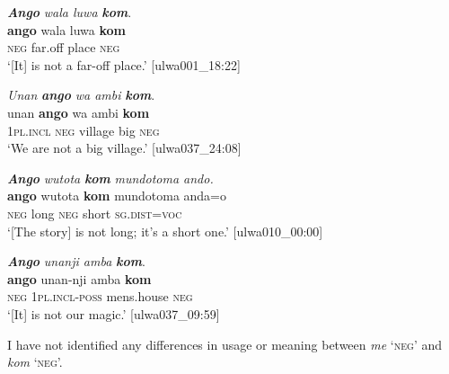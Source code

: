 

\ea%
    \label{ex:syntax:151}
          \textbf{\textit{Ango}} \textit{wala luwa} \textbf{\textit{kom}}.\\
\gll \textbf{ango}  wala  luwa  \textbf{kom}\\
    \textsc{neg}  far.off  place  \textsc{neg}\\
\glt `[It] is not a far-off place.’ [ulwa001\_18:22]
\z

\ea%
    \label{ex:syntax:152}
          \textit{Unan} \textbf{\textit{ango}} \textit{wa ambi} \textbf{\textit{kom}}.\\
\gll unan    \textbf{ango}  wa    ambi  \textbf{kom}\\
    1\textsc{pl.incl}  \textsc{neg}  village  big    \textsc{neg}\\
\glt `We are not a big village.’ [ulwa037\_24:08]
\z

\ea%
    \label{ex:syntax:153}
          \textbf{\textit{Ango}} \textit{wutota} \textbf{\textit{kom}} \textit{mundotoma ando.}\\
\gll    \textbf{ango}  wutota  \textbf{kom}  mundotoma  anda{}=o\\
    \textsc{neg}  long  \textsc{neg}  short      \textsc{sg.dist=voc}\\
\glt `[The story] is not long; it’s a short one.’ [ulwa010\_00:00]
\z

\ea%
    \label{ex:syntax:154}
          \textbf{\textit{Ango}} \textit{unanji amba} \textbf{\textit{kom}}.\\
\gll \textbf{ango}  unan-nji    amba      \textbf{kom}\\
    \textsc{neg}  \textsc{1pl.incl-poss}  mens.house  \textsc{neg}\\
\glt `[It] is not our magic.’ [ulwa037\_09:59]
\z

I have not identified any differences in usage or meaning between \textit{me} ‘\textsc{neg}’ and \textit{kom} ‘\textsc{neg}’.

